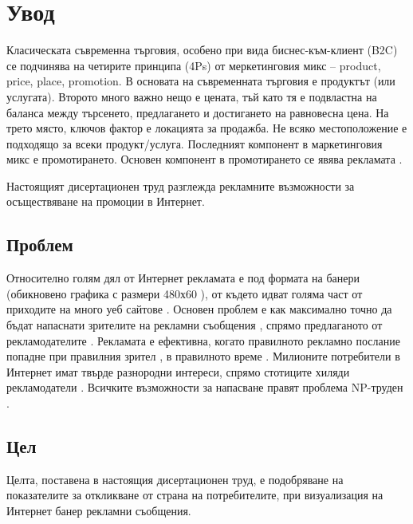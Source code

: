 \chapter*{Увод}

Класическата съвременна търговия, особено при вида биснес-към-клиент (B2C) се подчинява на четирите принципа (4Ps) от меркетинговия микс – product, price, place, promotion. В основата на съвременната търговия е продуктът (или услугата). Второто много важно нещо е цената, тъй като тя е подвластна на баланса между търсенето, предлагането и достигането на равновесна цена. На трето място, ключов фактор е локацията за продажба. Не всяко местоположение е подходящо за всеки продукт/услуга. Последният компонент в маркетинговия микс е промотирането. Основен компонент в промотирането се явява рекламата \cite{POCOL170134}. 

Настоящият дисертационен труд разглежда рекламните възможности за осъществяване на промоции в Интернет. 

\section*{Проблем}

Относително голям дял от Интернет рекламата е под формата на банери \cite{1597398, usmonova_dilfuza_ilkhomovna_usmanov_shak_2022_7110290} (обикновено графика с размери 480х60 \cite{doi:10.1509/jmkr.43.1.98}), от където идват голяма част от приходите на много уеб сайтове \cite{7325200}. Основен проблем е как максимално точно да бъдат напаснати зрителите на рекламни съобщения \cite{10.1145/2939672.2939724}, спрямо предлаганото от рекламодателите \cite{MIRALLESPECHUAN201839}. Рекламата е ефективна, когато правилното рекламно послание попадне при правилния зрител \cite{10.1145/2339530.2339655}, в правилното време \cite{9199371}. Милионите потребители в Интернет имат твърде разнородни интереси, спрямо стотиците хиляди рекламодатели \cite{10.1145/3097983.3098134}. Всичките възможности за напасване правят проблема NP-труден \cite{KIM2020106226}.

\section*{Цел}

Целта, поставена в настоящия дисертационен труд, е подобряване на показателите за откликване от страна на потребителите, при визуализация на Интернет банер рекламни съобщения. 

